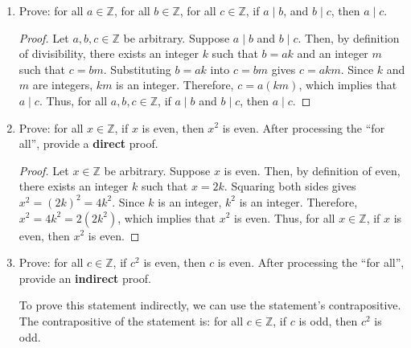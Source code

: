 \documentclass{article}
\begin{document}
\begin{enumerate}
            \newpage

      \item Prove: for all $a \in \mathbb{Z}$, for all $b \in \mathbb{Z}$, for all $c \in
                  \mathbb{Z}$, if $a \mid b$, and $b \mid c$, then $a \mid c$.

            \begin{proof}
                  Let $a, b, c \in \mathbb{Z}$ be arbitrary. Suppose $a \mid b$ and $b \mid c$.
                  Then, by definition of divisibility, there exists an integer $k$ such that $b = ak$ and an integer $m$ such that $c = bm$.
                  Substituting $b = ak$ into $c = bm$ gives $c = akm$. Since $k$ and $m$ are integers, $km$ is an integer.
                  Therefore, $c = a(km)$, which implies that $a \mid c$. Thus, for all $a, b, c \in \mathbb{Z}$, if $a \mid b$ and $b \mid c$, then $a \mid c$.
            \end{proof}

            \newpage

      \item Prove: for all $x \in \mathbb{Z}$, if $x$ is even, then $x^2$ is even. After
            processing the ``for all'', provide a {\bf direct} proof.

            \begin{proof}
                  Let $x \in \mathbb{Z}$ be arbitrary. Suppose $x$ is even. Then, by definition of even, there exists an integer $k$ such that $x = 2k$.
                  Squaring both sides gives $x^2 = {(2k)}^2 = 4k^2$.
                  Since $k$ is an integer, $k^2$ is an integer.
                  Therefore, $x^2 = 4k^2 = 2(2k^2)$, which implies that $x^2$ is even.
                  Thus, for all $x \in \mathbb{Z}$, if $x$ is even, then $x^2$ is even.
            \end{proof}

            \newpage

      \item Prove: for all $c \in \mathbb{Z}$, if $c^2$ is even, then $c$ is even. After
            processing the ``for all'', provide an {\bf indirect} proof.

            To prove this statement indirectly, we can use the statement's contrapositive.
            The contrapositive of the statement is: for all $c \in \mathbb{Z}$, if $c$ is
            odd, then $c^2$ is odd.


\end{enumerate}
\end{document}
